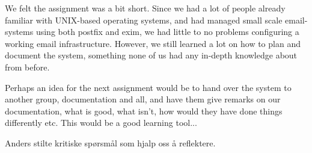 

We felt the assignment was a bit short. Since we had a lot of people already
familiar with UNIX-based operating systems, and had managed small scale email-systems using both postfix and exim, we had little to no problems configuring a working email infrastructure. However, we still learned a lot on how to plan and document the system, something none of us had any in-depth knowledge about from before. 

Perhaps an idea for the next assignment would be to hand over the system to another group, documentation and all, and have them give remarks on our documentation, what is good, what isn't, how would they have done things differently etc. This would be a good learning tool...

Anders stilte kritiske spørsmål som hjalp oss å reflektere.

